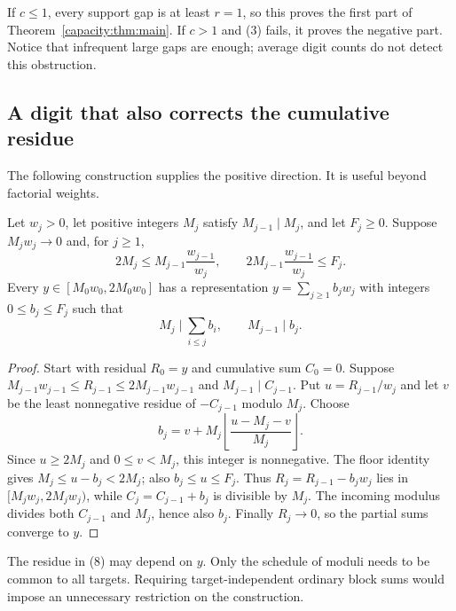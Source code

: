 \documentclass[11pt]{article}
\begin{document}
If $c\le1$, every support gap is at least $r=1$, so this proves the first
part of Theorem~\ref{capacity:thm:main}. If $c>1$ and (3) fails, it proves the negative
part. Notice that infrequent large gaps are enough; average digit counts do
not detect this obstruction.

\subsection{A digit that also corrects the cumulative residue}
The following construction supplies the positive direction. It is useful
beyond factorial weights.

\begin{lemma}\label{capacity:lem:feedback}
Let $w_j>0$, let positive integers $M_j$ satisfy $M_{j-1}\mid M_j$, and let
$F_j\ge0$. Suppose $M_jw_j\to0$ and, for $j\ge1$,
\[
 2M_j\le M_{j-1}\frac{w_{j-1}}{w_j},\qquad
 2M_{j-1}\frac{w_{j-1}}{w_j}\le F_j.
 \tag{7}\label{capacity:eq:step}
\]
Every $y\in[M_0w_0,2M_0w_0]$ has a representation
$y=\sum_{j\ge1}b_jw_j$ with integers $0\le b_j\le F_j$ such that
\[
 M_j\mid\sum_{i\le j}b_i,\qquad M_{j-1}\mid b_j.
\]
\end{lemma}
\begin{proof}
Start with residual $R_0=y$ and cumulative sum $C_0=0$. Suppose
$M_{j-1}w_{j-1}\le R_{j-1}\le2M_{j-1}w_{j-1}$ and
$M_{j-1}\mid C_{j-1}$. Put $u=R_{j-1}/w_j$ and let
$v$ be the least nonnegative residue of $-C_{j-1}$ modulo $M_j$. Choose
\[
 b_j=v+M_j\left\lfloor\frac{u-M_j-v}{M_j}\right\rfloor.
 \tag{8}\label{capacity:eq:selector}
\]
Since $u\ge2M_j$ and $0\le v<M_j$, this integer is nonnegative.
The floor identity gives $M_j\le u-b_j<2M_j$; also $b_j\le u\le F_j$.
Thus $R_j=R_{j-1}-b_jw_j$ lies in
$[M_jw_j,2M_jw_j)$, while $C_j=C_{j-1}+b_j$ is divisible by $M_j$.
The incoming modulus divides both $C_{j-1}$ and $M_j$, hence also $b_j$.
Finally $R_j\to0$, so the partial sums converge to $y$.
\end{proof}
The residue in (8) may depend on $y$. Only the schedule of moduli needs to
be common to all targets. Requiring target-independent ordinary block sums
would impose an unnecessary restriction on the construction.
\end{document}
